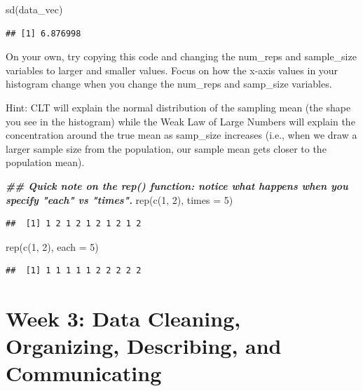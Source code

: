 \documentclass[
]{book}
\newenvironment{Shaded}{\begin{snugshade}}{\end{snugshade}}
\newcommand{\AttributeTok}[1]{\textcolor[rgb]{0.77,0.63,0.00}{#1}}
\newcommand{\DecValTok}[1]{\textcolor[rgb]{0.00,0.00,0.81}{#1}}
\newcommand{\DocumentationTok}[1]{\textcolor[rgb]{0.56,0.35,0.01}{\textbf{\textit{#1}}}}
\newcommand{\FunctionTok}[1]{\textcolor[rgb]{0.00,0.00,0.00}{#1}}
\newcommand{\NormalTok}[1]{#1}
\begin{document}
\begin{Shaded}
\begin{Highlighting}[]
\FunctionTok{sd}\NormalTok{(data\_vec)}
\end{Highlighting}
\end{Shaded}

\begin{verbatim}
## [1] 6.876998
\end{verbatim}

On your own, try copying this code and changing the num\_reps and sample\_size variables to larger and smaller values. Focus on how the x-axis values in your histogram change when you change the num\_reps and samp\_size variables.

Hint: CLT will explain the normal distribution of the sampling mean (the shape you see in the histogram) while the Weak Law of Large Numbers will explain the concentration around the true mean as samp\_size increases (i.e., when we draw a larger sample size from the population, our sample mean gets closer to the population mean).

\begin{Shaded}
\begin{Highlighting}[]
\DocumentationTok{\#\# Quick note on the rep() function: notice what happens when you specify "each" vs "times".}
\FunctionTok{rep}\NormalTok{(}\FunctionTok{c}\NormalTok{(}\DecValTok{1}\NormalTok{, }\DecValTok{2}\NormalTok{), }\AttributeTok{times =} \DecValTok{5}\NormalTok{)}
\end{Highlighting}
\end{Shaded}

\begin{verbatim}
##  [1] 1 2 1 2 1 2 1 2 1 2
\end{verbatim}

\begin{Shaded}
\begin{Highlighting}[]
\FunctionTok{rep}\NormalTok{(}\FunctionTok{c}\NormalTok{(}\DecValTok{1}\NormalTok{, }\DecValTok{2}\NormalTok{), }\AttributeTok{each =} \DecValTok{5}\NormalTok{)}
\end{Highlighting}
\end{Shaded}

\begin{verbatim}
##  [1] 1 1 1 1 1 2 2 2 2 2
\end{verbatim}

\hypertarget{week-3-data-cleaning-organizing-describing-and-communicating}{%
\chapter{Week 3: Data Cleaning, Organizing, Describing, and Communicating}\label{week-3-data-cleaning-organizing-describing-and-communicating}}
\end{document}
